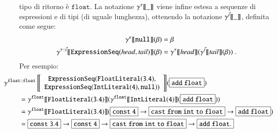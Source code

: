 tipo di ritorno \`e $\mathtt{float}$.
La notazione ${\gamma^{{\tau}}[\![{\_}]\!]}$ viene infine
estesa a sequenze di espressioni e di tipi (di uguale lunghezza),
ottenendo la notazione ${\gamma^{{\vec{t}}}[\![{\_}]\!]}$, definita come segue:
%
\begin{align*}
  \gentwo{\epsilon}{\mathtt{null}}(\beta)&=\beta\\
  \gentwo{\tau::\vec{t}}{\mathtt{ExpressionSeq(\mathit{head},
    \mathit{tail})}}(\beta)&=\gentwo{\tau}{\mathit{head}}(\gentwo{\vec{t}}
    {\mathit{tail}}(\beta))~.
\end{align*}
%
Per esempio:
%
{\small
\begin{align*}
  &\hspace*{-5ex}\gentwotwo{\mathtt{float}::\mathtt{float}}
    {\begin{array}{c}
     \mathtt{ExpressionSeq(FloatLiteral(3.4),}\\
     \mathtt{ExpressionSeq(IntLiteral(4),null))}
     \end{array}}
    (\fbox{$\mathtt{add\ float}$})\\
  &=\gentwo{\mathtt{float}}{\mathtt{FloatLiteral(3.4)}}
    (\gentwo{\mathtt{float}}{\mathtt{IntLiteral(4)}}
    (\fbox{$\mathtt{add\ float}$}))\\
  &=\gentwo{\mathtt{float}}{\mathtt{FloatLiteral(3.4)}}
    (\fbox{$\mathtt{const\ 4}$}\to\fbox{$\mathtt{cast\ from\ int\ to\ float}$}
    \to\fbox{$\mathtt{add\ float}$})\\
  &=\fbox{$\mathtt{const\ 3.4}$}
    \to\fbox{$\mathtt{const\ 4}$}\to\fbox{$\mathtt{cast\ from\ int\ to \ float}$}
    \to\fbox{$\mathtt{add\ float}$.}
\end{align*}}

